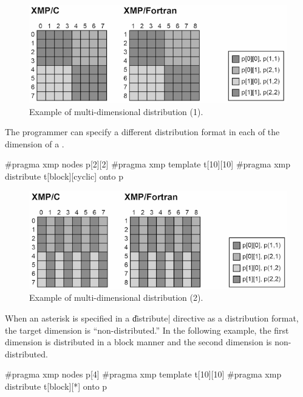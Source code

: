 \begin{figure}
  \centering
  \includegraphics[width=0.9\columnwidth]{figs/multi.png}
  \caption{Example of multi-dimensional distribution (1).}
\end{figure}

The programmer can specify a different distribution format in each of
the dimension of a {\template}.

\begin{XCexample}
#pragma xmp nodes p[2][2]
#pragma xmp template t[10][10]
#pragma xmp distribute t[block][cyclic] onto p
\end{XCexample}


\begin{figure}
  \centering
  \includegraphics[width=0.9\columnwidth]{figs/multi2.png}
  \caption{Example of multi-dimensional distribution (2).}
\end{figure}

When an asterisk is specified in a \|distribute| directive as
a distribution format, the target dimension is ``non-distributed.'' In
the following example, the first dimension is distributed in a
block manner and the second dimension is non-distributed.

\begin{XCexample}
#pragma xmp nodes p[4]
#pragma xmp template t[10][10]
#pragma xmp distribute t[block][*] onto p
\end{XCexample}

